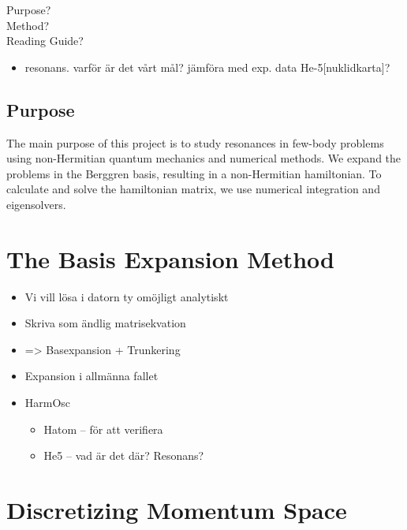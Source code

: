 \documentclass[12pt,a4paper]{report}
\begin{document}
{\Large Purpose? \\ Method? \\ Reading Guide?}

\begin{itemize}
  \item resonans. varför är det vårt mål? jämföra med exp. data He-5[nuklidkarta]?
\end{itemize}

\section{Purpose}

The main purpose of this project is to study resonances in few-body problems using non-Hermitian quantum mechanics and numerical methods. We expand the problems in the Berggren basis, resulting in a non-Hermitian hamiltonian. To calculate and solve the hamiltonian matrix, we use numerical integration and eigensolvers.

\chapter{The Basis Expansion Method} %
\label{cha:the_basis_expansion_method}

\begin{itemize}
  \item Vi vill lösa i datorn ty omöjligt analytiskt
  \item Skriva som ändlig matrisekvation
  \item => Basexpansion + Trunkering
  \item Expansion i allmänna fallet
  \item HarmOsc
  \begin{itemize}
    \item Hatom – för att verifiera
    \item He5 – vad är det där? Resonans?
  \end{itemize}
  \iitem 
\end{itemize}

\chapter{Discretizing Momentum Space} %
\label{cha:discretizing_momentum_space}
\end{document}
